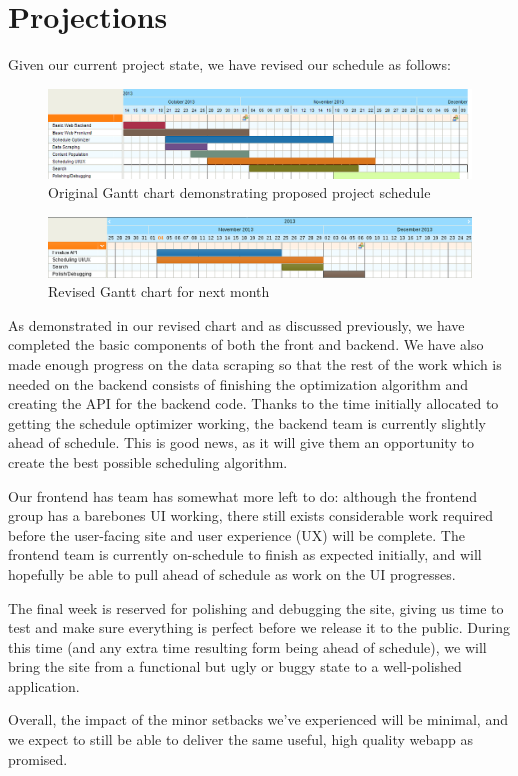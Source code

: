 \section{Projections}
Given our current project state, we have revised our schedule as follows:
\begin{figure}[h!]
  \centering
  \includegraphics[width=\textwidth]{gantt.png}
  \caption{Original Gantt chart demonstrating proposed project schedule}
\end{figure}
\begin{figure}[h!]
  \centering
  \includegraphics[width=\textwidth]{revised-gantt.png}
  \caption{Revised Gantt chart for next month}
\end{figure}

As demonstrated in our revised chart and as discussed previously, we have
completed the basic components of both the front and backend. We have also
made enough progress on the data scraping so that the rest of the work which
is needed on the backend consists of finishing the optimization algorithm and
creating the API for the backend code. Thanks to the time initially
allocated to getting the schedule optimizer working, the backend team is
currently slightly ahead of schedule. This is good news, as it will
give them an opportunity to create the best possible scheduling algorithm.

Our frontend has team has somewhat more left to do: although the frontend group
has a barebones UI working, there still exists considerable work required
before the user-facing site and user experience (UX) will be complete.
The frontend team is currently on-schedule to finish as expected initially,
and will hopefully be able to pull ahead of schedule as work on the UI
progresses.

The final week is reserved for polishing and debugging the site, giving us 
time to test and make sure everything is perfect before we release it to the 
public.  During this time (and any extra time resulting form being ahead of
schedule), we will bring the site from a functional but ugly or buggy state
to a well-polished application.

Overall, the impact of the minor setbacks we've experienced will be minimal,
and we expect to still be able to deliver the same useful, high quality
webapp as promised.
